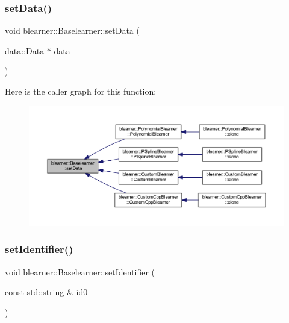\subsubsection{\texorpdfstring{set\+Data()}{setData()}}
{\footnotesize\ttfamily void blearner\+::\+Baselearner\+::set\+Data (\begin{DoxyParamCaption}\item[{\mbox{\hyperlink{classdata_1_1_data}{data\+::\+Data}} $\ast$}]{data }\end{DoxyParamCaption})}

Here is the caller graph for this function\+:
\nopagebreak
\begin{figure}[H]
\begin{center}
\leavevmode
\includegraphics[width=350pt]{classblearner_1_1_baselearner_a29122c6125ef6ec03ad84602b3e2d0d4_icgraph}
\end{center}
\end{figure}
\mbox{\label{classblearner_1_1_baselearner_a6669906a481cbdd516dce8df6f6e5b76}} 
\subsubsection{\texorpdfstring{set\+Identifier()}{setIdentifier()}}
{\footnotesize\ttfamily void blearner\+::\+Baselearner\+::set\+Identifier (\begin{DoxyParamCaption}\item[{const std\+::string \&}]{id0 }\end{DoxyParamCaption})}

